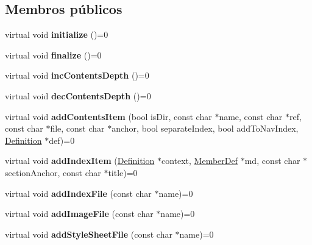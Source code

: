 \subsection*{Membros públicos}
\begin{DoxyCompactItemize}
\item 
\hypertarget{class_index_intf_aa5085af8ee5e5c39b4c20c60231e5c92}{virtual void {\bfseries initialize} ()=0}\label{class_index_intf_aa5085af8ee5e5c39b4c20c60231e5c92}

\item 
\hypertarget{class_index_intf_a5882b5eaf11f8b1561d5bb4ecdc217c3}{virtual void {\bfseries finalize} ()=0}\label{class_index_intf_a5882b5eaf11f8b1561d5bb4ecdc217c3}

\item 
\hypertarget{class_index_intf_a911c5d13349c86d473948cf482079aec}{virtual void {\bfseries inc\-Contents\-Depth} ()=0}\label{class_index_intf_a911c5d13349c86d473948cf482079aec}

\item 
\hypertarget{class_index_intf_a1327a5e7eabd10a3aac7ba01f33c86b6}{virtual void {\bfseries dec\-Contents\-Depth} ()=0}\label{class_index_intf_a1327a5e7eabd10a3aac7ba01f33c86b6}

\item 
\hypertarget{class_index_intf_a204183863bfd48725da7de591714dd94}{virtual void {\bfseries add\-Contents\-Item} (bool is\-Dir, const char $\ast$name, const char $\ast$ref, const char $\ast$file, const char $\ast$anchor, bool separate\-Index, bool add\-To\-Nav\-Index, \hyperlink{class_definition}{Definition} $\ast$def)=0}\label{class_index_intf_a204183863bfd48725da7de591714dd94}

\item 
\hypertarget{class_index_intf_a996e1909e4e4e19e11c3affb40819259}{virtual void {\bfseries add\-Index\-Item} (\hyperlink{class_definition}{Definition} $\ast$context, \hyperlink{class_member_def}{Member\-Def} $\ast$md, const char $\ast$section\-Anchor, const char $\ast$title)=0}\label{class_index_intf_a996e1909e4e4e19e11c3affb40819259}

\item 
\hypertarget{class_index_intf_a2120174cec4574bfc2602ab95468c9f6}{virtual void {\bfseries add\-Index\-File} (const char $\ast$name)=0}\label{class_index_intf_a2120174cec4574bfc2602ab95468c9f6}

\item 
\hypertarget{class_index_intf_adc21deacb458ca278be70e9229c84b24}{virtual void {\bfseries add\-Image\-File} (const char $\ast$name)=0}\label{class_index_intf_adc21deacb458ca278be70e9229c84b24}

\item 
\hypertarget{class_index_intf_a6d8744b862ebb6ab750c143bc083c453}{virtual void {\bfseries add\-Style\-Sheet\-File} (const char $\ast$name)=0}\label{class_index_intf_a6d8744b862ebb6ab750c143bc083c453}

\end{DoxyCompactItemize}


